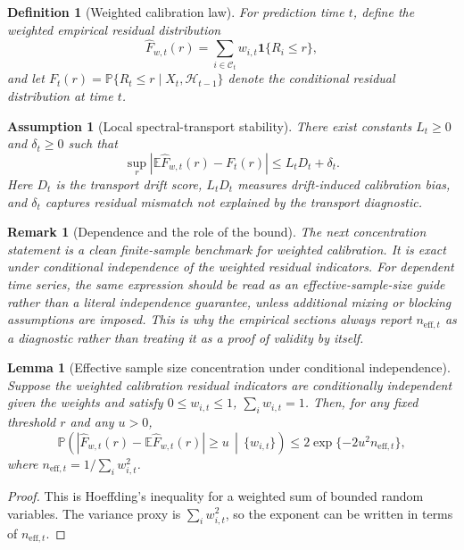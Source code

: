 \documentclass[11pt]{article}
\newtheorem{lemma}{Lemma}
\newtheorem{assumption}{Assumption}
\newtheorem{definition}{Definition}
\newtheorem{remark}{Remark}
\begin{document}
\begin{definition}[Weighted calibration law]
For prediction time $t$, define the weighted empirical residual distribution
\[
    \widehat F_{w,t}(r)=\sum_{i\in\mathcal{C}_t} w_{i,t}\mathbf{1}\{R_i\leq r\},
\]
and let $F_t(r)=\mathbb{P}\{R_t\leq r\mid X_t,\mathcal{H}_{t-1}\}$ denote the conditional residual distribution at time $t$.
\end{definition}

\begin{assumption}[Local spectral-transport stability]
There exist constants $L_t\geq 0$ and $\delta_t\geq 0$ such that
\[
    \sup_r |\mathbb{E}\widehat F_{w,t}(r)-F_t(r)|
    \leq
    L_t D_t+\delta_t.
\]
Here $D_t$ is the transport drift score, $L_tD_t$ measures drift-induced calibration bias, and $\delta_t$ captures residual mismatch not explained by the transport diagnostic.
\end{assumption}

\begin{remark}[Dependence and the role of the bound]
The next concentration statement is a clean finite-sample benchmark for weighted calibration. It is exact under conditional independence of the weighted residual indicators. For dependent time series, the same expression should be read as an effective-sample-size guide rather than a literal independence guarantee, unless additional mixing or blocking assumptions are imposed. This is why the empirical sections always report $n_{\mathrm{eff},t}$ as a diagnostic rather than treating it as a proof of validity by itself.
\end{remark}

\begin{lemma}[Effective sample size concentration under conditional independence]
Suppose the weighted calibration residual indicators are conditionally independent given the weights and satisfy $0\leq w_{i,t}\leq 1$, $\sum_i w_{i,t}=1$. Then, for any fixed threshold $r$ and any $u>0$,
\[
    \mathbb{P}\left(
    \left|\widehat F_{w,t}(r)-\mathbb{E}\widehat F_{w,t}(r)\right|\geq u
    \,\middle|\, \{w_{i,t}\}
    \right)
    \leq
    2\exp\{-2u^2 n_{\mathrm{eff},t}\},
\]
where $n_{\mathrm{eff},t}=1/\sum_i w_{i,t}^2$.
\end{lemma}

\begin{proof}
This is Hoeffding's inequality for a weighted sum of bounded random variables. The variance proxy is $\sum_i w_{i,t}^2$, so the exponent can be written in terms of $n_{\mathrm{eff},t}$.
\end{proof}
\end{document}
